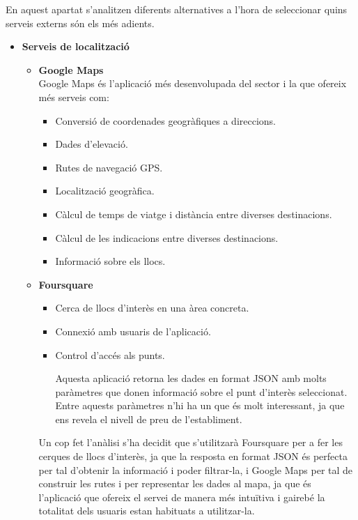 En aquest apartat s'analitzen diferents alternatives a l'hora de seleccionar
quins serveis externs són els més adients.
\begin{itemize}
\item[]\textbf{Serveis de localització}
\begin{itemize}
\item{}\textbf{Google Maps}\\
Google Maps és l'aplicació més desenvolupada del sector i la que
ofereix més serveis com:
\begin{itemize}
\item{}Conversió de coordenades geogràfiques a direccions.
\item{}Dades d'elevació.
\item{}Rutes de navegació GPS.
\item{}Localització geogràfica.
\item{}Càlcul de temps de viatge i distància entre diverses destinacions.
\item{}Càlcul de les indicacions entre diverses destinacions.
\item{}Informació sobre els llocs.
\end{itemize}
\item{}\textbf{Foursquare}
\begin{itemize}
\item{}Cerca de llocs d'interès en una àrea concreta.
\item{}Connexió amb usuaris de l'aplicació.
\item{}Control d'accés als punts.

Aquesta aplicació retorna les dades en format JSON amb molts
paràmetres que donen informació sobre el punt d'interès seleccionat. Entre aquests paràmetres n'hi ha un que és molt interessant, ja que ens revela el nivell de preu de l'establiment.
\end{itemize}
Un cop fet l'anàlisi s'ha decidit que s'utilitzarà Foursquare per a fer les cerques de llocs d'interès, ja que la resposta en format JSON
és perfecta per tal d'obtenir la informació i poder filtrar-la, i Google
Maps per tal de construir les rutes i per representar les dades al mapa, ja que és l'aplicació que ofereix el servei de manera més intuïtiva i
gairebé la totalitat dels usuaris estan habituats a utilitzar-la.

\end{itemize}


\end{itemize}
